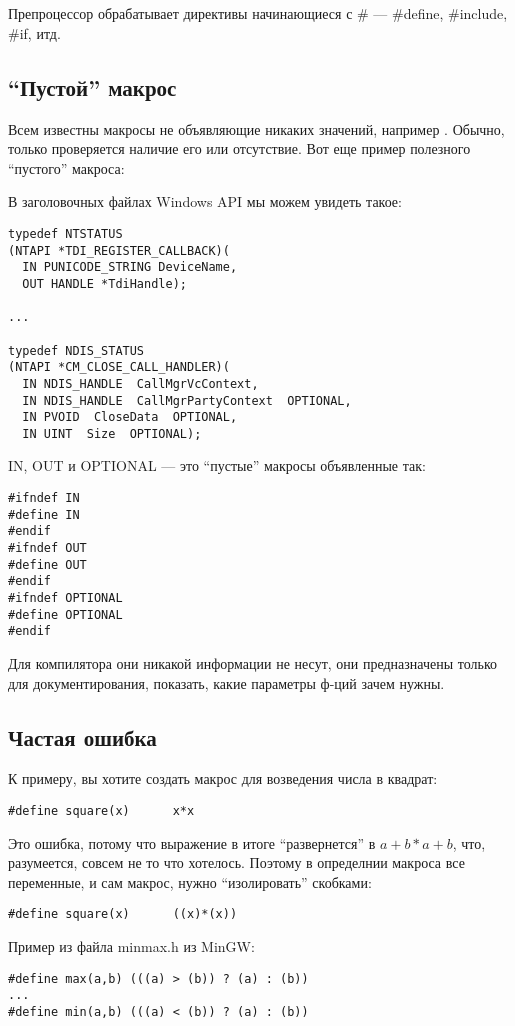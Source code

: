 ﻿\chapter{}

Препроцессор обрабатывает директивы начинающиеся с \# --- \#define, \#include, \#if, итд.

\section{``Пустой'' макрос}

Всем известны макросы не объявляющие никаких значений, например .
Обычно, только проверяется наличие его или отсутствие.
Вот еще пример полезного ``пустого'' макроса:

В заголовочных файлах Windows API мы можем увидеть такое:

\begin{lstlisting}
typedef NTSTATUS
(NTAPI *TDI_REGISTER_CALLBACK)(
  IN PUNICODE_STRING DeviceName,
  OUT HANDLE *TdiHandle);

...

typedef NDIS_STATUS
(NTAPI *CM_CLOSE_CALL_HANDLER)(
  IN NDIS_HANDLE  CallMgrVcContext,
  IN NDIS_HANDLE  CallMgrPartyContext  OPTIONAL,
  IN PVOID  CloseData  OPTIONAL,
  IN UINT  Size  OPTIONAL);
\end{lstlisting}

IN, OUT и OPTIONAL --- это ``пустые'' макросы объявленные так:

\begin{lstlisting}
#ifndef IN
#define IN
#endif
#ifndef OUT
#define OUT
#endif
#ifndef OPTIONAL
#define OPTIONAL
#endif
\end{lstlisting}

Для компилятора они никакой информации не несут, они предназначены только для документирования, показать,
какие параметры ф-ций зачем нужны.

\section{Частая ошибка}

К примеру, вы хотите создать макрос для возведения числа в квадрат:

\begin{lstlisting}
#define square(x)      x*x
\end{lstlisting}

Это ошибка, потому что выражение  в итоге ``развернется'' в $a+b*a+b$, что, разумеется, совсем
не то что хотелось. Поэтому в определнии макроса все переменные, и сам макрос, нужно ``изолировать'' скобками:

\begin{lstlisting}
#define square(x)      ((x)*(x))
\end{lstlisting}

Пример из файла minmax.h из MinGW:

\begin{lstlisting}
#define max(a,b) (((a) > (b)) ? (a) : (b))
...
#define min(a,b) (((a) < (b)) ? (a) : (b))
\end{lstlisting}


